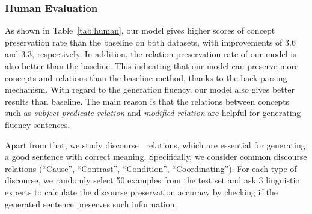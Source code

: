 \documentclass[11pt,a4paper]{article}
\begin{document}
\subsubsection{Human Evaluation}
As shown in Table~\ref{tab:human}, our model gives higher scores of concept preservation rate than the baseline on both datasets, with improvements of 3.6 and 3.3, respectively. 
In addition, the relation preservation rate of our model is also better than the baseline.
This indicating that our model can preserve more concepts and relations than the baseline method, thanks to the back-parsing mechanism. 
With regard to the generation fluency, our model also gives better results than baseline.
The main reason is that the relations between concepts such as \textit{subject-predicate relation} and \textit{modified relation} are helpful for generating fluency sentences.
\begin{table}
	\small
	\caption{\label{tab:human} Human evaluation of the sentences generated by different systems on concept presevation rate (CPR), relation preservation rate (RPR) and fluency.}
\end{table}
\begin{table}
	\small
	\caption{\label{tab:discourse} Human study for discourse preservation accuracy on LDC2015E86.} 
\end{table}
Apart from that, we study discourse~\cite{prasad-etal-2008-penn}  relations, which are essential for generating a good sentence with correct meaning.
Specifically, we consider  common discourse relations (``Cause'', ``Contrast'', ``Condition'', ``Coordinating'').  For each type of discourse, we randomly select 50 examples from the test set and ask 3 linguistic experts to calculate the discourse preservation accuracy by checking if the generated sentence preserves such information.
\end{document}
